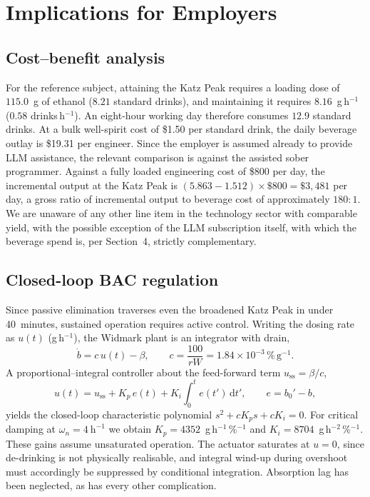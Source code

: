 \documentclass[11pt]{article}
\newcommand{\pct}{\,\%}
\begin{document}
\section{Implications for Employers}

\subsection{Cost--benefit analysis}

For the reference subject, attaining the Katz Peak requires a loading dose of $115.0$~g of ethanol ($8.21$ standard drinks), and maintaining it requires $8.16$~g\,h$^{-1}$ ($0.58$ drinks\,h$^{-1}$). An eight-hour working day therefore consumes $12.9$ standard drinks. At a bulk well-spirit cost of \$1.50 per standard drink, the daily beverage outlay is \$19.31 per engineer. Since the employer is assumed already to provide LLM assistance, the relevant comparison is against the assisted sober programmer. Against a fully loaded engineering cost of \$800 per day, the incremental output at the Katz Peak is $(5.863 - 1.512) \times \$800 = \$3{,}481$ per day, a gross ratio of incremental output to beverage cost of approximately $180{:}1$. We are unaware of any other line item in the technology sector with comparable yield, with the possible exception of the LLM subscription itself, with which the beverage spend is, per Section~4, strictly complementary.

\subsection{Closed-loop BAC regulation}

Since passive elimination traverses even the broadened Katz Peak in under 40~minutes, sustained operation requires active control. Writing the dosing rate as $u(t)$ (g\,h$^{-1}$), the Widmark plant is an integrator with drain,
\begin{equation}
\dot{b} = c\,u(t) - \beta, \qquad c = \frac{100}{rW} = 1.84 \times 10^{-3}\pct\,\mathrm{g}^{-1}.
\end{equation}
A proportional--integral controller about the feed-forward term $u_\mathrm{ss} = \beta/c$,
\begin{equation}
u(t) = u_\mathrm{ss} + K_p\, e(t) + K_i \int_0^t e(t')\,\mathrm{d}t', \qquad e = b_0' - b,
\end{equation}
yields the closed-loop characteristic polynomial $s^{2} + cK_p s + cK_i = 0$. For critical damping at $\omega_n = 4~\mathrm{h}^{-1}$ we obtain $K_p = 4352$~g\,h$^{-1}$\,\%$^{-1}$ and $K_i = 8704$~g\,h$^{-2}$\,\%$^{-1}$. These gains assume unsaturated operation. The actuator saturates at $u = 0$, since de-drinking is not physically realisable, and integral wind-up during overshoot must accordingly be suppressed by conditional integration. Absorption lag has been neglected, as has every other complication.
\end{document}
